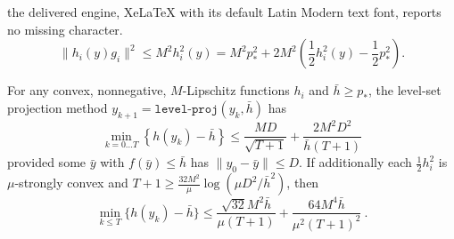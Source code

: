 \documentclass[10pt,a4paper]{amsart}
\begin{document}
the delivered engine, XeLaTeX with its default Latin Modern text font, reports no missing character.
\begin{equation}
    \|h_i(y)g_i\|^2 \leq M^2h_i^2(y) = M^2p_*^2 + 2M^2\left(\frac{1}{2}h^2_i(y) - \frac{1}{2}p_*^2\right). \label{eq:general-subgrad-bound}
\end{equation}

\begin{theorem}\label{thm:level-proj-convergence}
    For any convex, nonnegative, $M$-Lipschitz functions $h_i$ and $\bar h \geq p_*$, the level-set projection method $y_{k+1}=\mathtt{level\mbox{-}proj}(y_k,\bar h)$  has
    $$ \min_{k=0\dots T}\left\{h(y_k) - \bar h\right\} \leq \frac{MD}{\sqrt{T+1}} + \frac{2M^2D^2}{\bar h(T+1)} $$
    provided some $\bar y$ with $f(\bar y)\leq \bar h$ has $\|y_0-\bar y\|\leq D$.
    If additionally each $\frac{1}{2}h_i^2$ is $\mu$-strongly convex and $T+1 \geq \frac{32M^2}{\mu}\log(\mu D^2/\bar h^2)$, then
    $$ \min_{k\leq T}\{h(y_k) - \bar h\} \leq \frac{\sqrt{32}M^2\bar h}{\mu (T+1)} + \frac{64M^4\bar h}{\mu^2(T+1)^2} \ . $$
\end{theorem}
\end{document}
